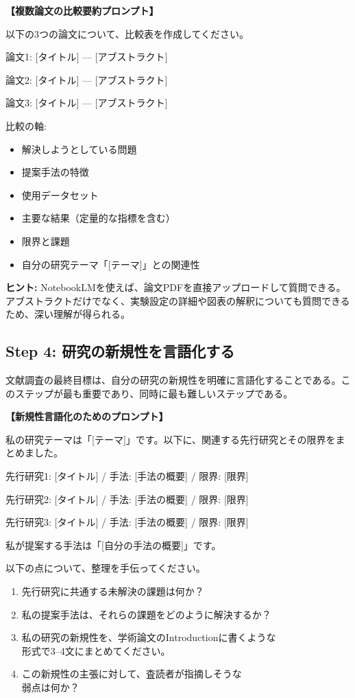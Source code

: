 \begin{promptbox}
\textbf{【複数論文の比較要約プロンプト】}

以下の3つの論文について、比較表を作成してください。

論文1: [タイトル] --- [アブストラクト]

論文2: [タイトル] --- [アブストラクト]

論文3: [タイトル] --- [アブストラクト]

比較の軸:
\begin{itemize}
\item 解決しようとしている問題
\item 提案手法の特徴
\item 使用データセット
\item 主要な結果（定量的な指標を含む）
\item 限界と課題
\item 自分の研究テーマ「[テーマ]」との関連性
\end{itemize}
\end{promptbox}

\begin{screen}
\textbf{ヒント:} NotebookLMを使えば、論文PDFを直接アップロードして質問できる。アブストラクトだけでなく、実験設定の詳細や図表の解釈についても質問できるため、深い理解が得られる。
\end{screen}

\subsection{Step 4: 研究の新規性を言語化する}

文献調査の最終目標は、自分の研究の新規性を明確に言語化することである。このステップが最も重要であり、同時に最も難しいステップである。

\begin{promptbox}
\textbf{【新規性言語化のためのプロンプト】}

私の研究テーマは「[テーマ]」です。以下に、関連する先行研究とその限界をまとめました。

先行研究1: [タイトル] / 手法: [手法の概要] / 限界: [限界]

先行研究2: [タイトル] / 手法: [手法の概要] / 限界: [限界]

先行研究3: [タイトル] / 手法: [手法の概要] / 限界: [限界]

私が提案する手法は「[自分の手法の概要]」です。

以下の点について、整理を手伝ってください。
\begin{enumerate}
\item 先行研究に共通する未解決の課題は何か？
\item 私の提案手法は、それらの課題をどのように解決するか？
\item 私の研究の新規性を、学術論文のIntroductionに書くような\\
形式で3--4文にまとめてください。
\item この新規性の主張に対して、査読者が指摘しそうな\\
弱点は何か？
\end{enumerate}
\end{promptbox}


